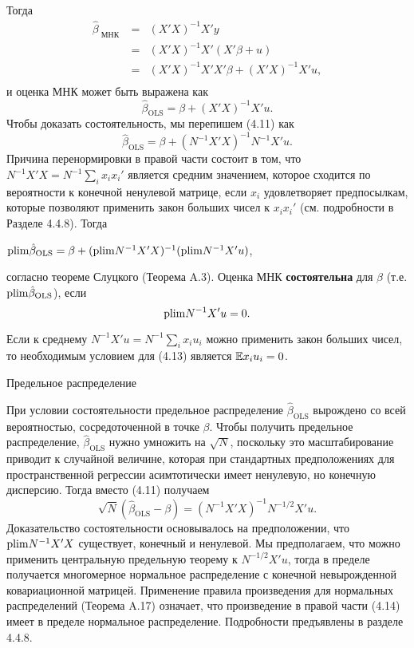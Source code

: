 Тогда
\[
\begin{array}{rcl}
\hat{\beta}_{\text{ МНК }}&=&(X'X)^{-1}X'y \\ 
&=& (X'X)^{-1}X'(X'\beta+u) \\
&=&(X'X)^{-1}X'X'\beta+(X'X)^{-1}X'u, \\
\end{array}
\]
и оценка МНК может быть выражена как
\begin{equation}
\hat{\beta}_{\text{OLS}} = \beta + (X'X)^{-1}X'u.
\end{equation}
Чтобы доказать состоятельность, мы перепишем (4.11) как
\begin{equation}
\hat{\beta}_{\text{OLS}} = \beta + (N^{-1}X'X)^{-1}N^{-1}X'u.
\end{equation}
Причина перенормировки в правой части состоит в том, что $N^{-1}X'X = N^{-1}\sum_i x_i x_i'$ является средним значением, которое сходится по вероятности к конечной ненулевой матрице, если $x_i$ удовлетворяет предпосылкам, которые позволяют применить закон больших чисел к $x_i x_i'$ (см. подробности в Разделе 4.4.8). Тогда

\begin{center}
$\mathrm{plim } \hat{\beta}_{\text{OLS}} = \beta + (\mathrm{plim } N^{-1} X'X)^{-1}(\mathrm{plim } N^{-1}X'u)$, 
\end{center} 

согласно теореме Слуцкого (Теорема A.3). Оценка МНК \textbf{состоятельна} для $\beta$ (т.е. $\mathrm{plim } \hat{\beta}_{\text{OLS}}$), если 
\begin{equation}
\mathrm{plim } N^{-1}X'u = 0.
\end{equation}

Если к среднему $N^{-1}X'u = N^{-1} \sum_i x_i u_i$ можно применить закон больших чисел, то необходимым условием для (4.13) является $\mathbb{E}{x_i u_i}=0$.

\begin{center}
 Предельное распределение
 \end{center} 

При условии состоятельности предельное распределение $\hat{\beta}_{\text{OLS}}$ вырождено со всей вероятностью, сосредоточенной в точке $\beta$. Чтобы получить предельное распределение, $\hat{\beta}_{\text{OLS}}$ нужно умножить на $\sqrt{N}$, поскольку это масштабирование приводит к случайной величине, которая при стандартных предположениях для пространственной регрессии асимтотически имеет ненулевую, но конечную дисперсию. Тогда вместо (4.11) получаем
\begin{equation}
\sqrt{N} (\hat{\beta}_{\text{OLS}} - \beta) = (N^{-1}X'X)^{-1}N^{-1/2}X'u.
\end{equation}
Доказательство состоятельности основывалось на предположении, что $\mathrm{plim } N^{-1}X'X$ существует, конечный и ненулевой. Мы предполагаем, что можно применить центральную предельную теорему к $N^{-1/2}X'u$, тогда в пределе получается многомерное нормальное  распределение с конечной невырожденной ковариационной матрицей. Применение правила произведения для  нормальных распределений  (Теорема A.17) означает, что произведение в правой части (4.14) имеет в пределе нормальное распределение. Подробности предъявлены в разделе 4.4.8. 


